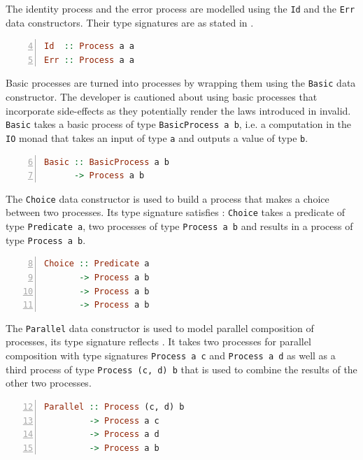 The identity process and the error process are modelled using the \texttt{Id} and the \texttt{Err} data constructors. Their type signatures are as stated in .
\begin{lstlisting}[language=Haskell,caption=Data constructors for the id and error process.,label=fig:local_datatypes,numbers=left,frame=bt,firstnumber=4]
Id  :: Process a a
Err :: Process a a
\end{lstlisting}

Basic processes are turned into processes by wrapping them using the \texttt{Basic} data constructor. The developer is cautioned about using basic processes that incorporate side-effects as they potentially render the laws introduced in  invalid. \texttt{Basic} takes a basic process of type \texttt{BasicProcess a b}, i.e. a computation in the \texttt{IO} monad that takes an input of type \texttt{a} and outputs a value of type \texttt{b}.
\begin{lstlisting}[language=Haskell,caption=Signature of the \texttt{Simple} data constructor.,numbers=left,frame=bt,firstnumber=6]
Basic :: BasicProcess a b
      -> Process a b
\end{lstlisting}

The \texttt{Choice} data constructor is used to build a process that makes a choice between two processes. Its type signature satisfies : \texttt{Choice} takes a predicate of type \texttt{Predicate a}, two processes of type \texttt{Process a b} and results in a process of type \texttt{Process a b}.
\begin{lstlisting}[language=Haskell,caption=Signature of the \texttt{Choice} data constructor.,numbers=left,frame=bt,firstnumber=8]
Choice :: Predicate a
       -> Process a b
       -> Process a b
       -> Process a b
\end{lstlisting}

The \texttt{Parallel} data constructor is used to model parallel composition of processes, its type signature reflects . It takes two processes for parallel composition with type signatures \texttt{Process a c} and \texttt{Process a d} as well as a third process of type \texttt{Process (c, d) b} that is used to combine the results of the other two processes.
\begin{lstlisting}[language=Haskell,caption=Signature of the \texttt{Parallel} data constructor.,numbers=left,frame=bt,firstnumber=12]
Parallel :: Process (c, d) b
         -> Process a c
         -> Process a d
         -> Process a b
\end{lstlisting}

